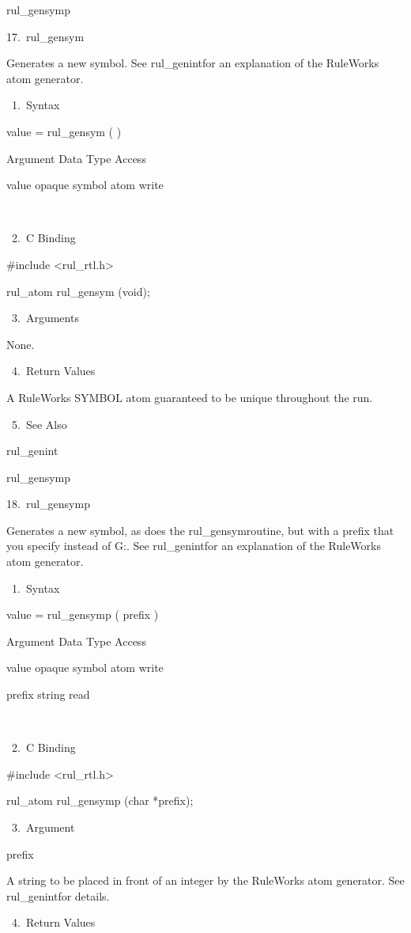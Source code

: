     rul_gensymp

17. rul_gensym

    Generates a new symbol. See rul_genintfor
    an explanation of the RuleWorks atom
    generator.

       1. Syntax

          value = rul_gensym ( )

          Argument  Data Type    Access

          value  opaque symbol atom  write

           

       2. C Binding

          #include <rul_rtl.h>

          rul_atom rul_gensym (void);

       3. Arguments

          None.

       4. Return Values

          A RuleWorks SYMBOL atom guaranteed
          to be unique throughout the run.

       5. See Also

    rul_genint

    rul_gensymp

18. rul_gensymp

    Generates a new symbol, as does the
    rul_gensymroutine, but with a prefix that
    you specify instead of G:. See
    rul_genintfor an explanation of the
    RuleWorks atom generator.

       1. Syntax

          value = rul_gensymp ( prefix )

          Argument  Data Type     Access

          value  opaque symbol atom   write

          prefix  string     read

           

       2. C Binding

          #include <rul_rtl.h>

          rul_atom rul_gensymp (char *prefix);

       3. Argument

          prefix

          A string to be placed in front of an
          integer by the RuleWorks atom
          generator. See rul_genintfor
          details.

       4. Return Values

